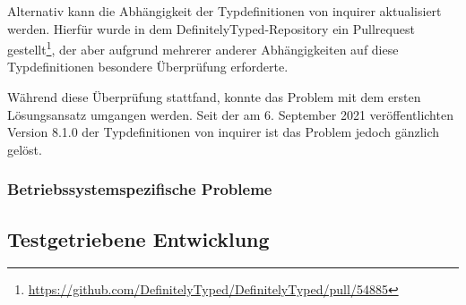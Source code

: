 Alternativ kann die Abhängigkeit der Typdefinitionen von inquirer aktualisiert werden. Hierfür wurde in dem DefinitelyTyped-Repository ein Pullrequest gestellt\footnote{\url{https://github.com/DefinitelyTyped/DefinitelyTyped/pull/54885}}, der aber aufgrund mehrerer anderer Abhängigkeiten auf diese Typdefinitionen besondere Überprüfung erforderte.

Während diese Überprüfung stattfand, konnte das Problem mit dem ersten Lösungsansatz umgangen werden. Seit der am 6. September 2021 veröffentlichten Version 8.1.0 der Typdefinitionen von inquirer ist das Problem jedoch gänzlich gelöst.

\subsubsection{Betriebssystemspezifische Probleme}
\subsection{Testgetriebene Entwicklung}